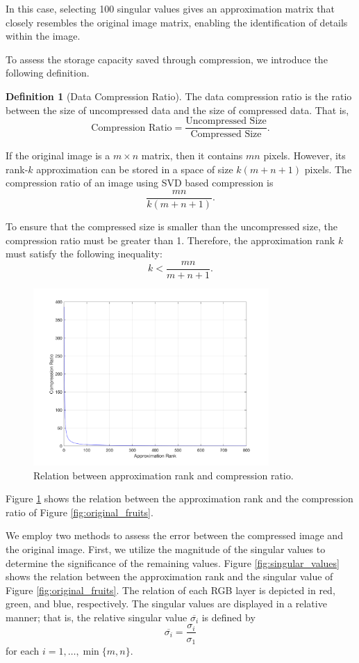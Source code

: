 \documentclass[12pt]{article}
\theoremstyle{definition}
\newtheorem{definition}[theorem]{Definition}
\begin{document}
In this case, selecting 100 singular values gives an approximation matrix that closely resembles the original image matrix, enabling the identification of details within the image.

To assess the storage capacity saved through compression, we introduce the following definition.

\begin{definition}[Data Compression Ratio]
    The data compression ratio is the ratio between the size of uncompressed data and the size of compressed data. That is,
    \[ \text{Compression Ratio} = \frac{\text{Uncompressed Size}}{\text{Compressed Size}}. \]
\end{definition}

If the original image is a $m\times n$ matrix, then it contains $mn$ pixels. However, its rank-$k$ approximation can be stored in a space of size $k(m+n+1)$ pixels. The compression ratio of an image using SVD based compression is
\[ \frac{mn}{k(m+n+1)}. \]

To ensure that the compressed size is smaller than the uncompressed size, the compression ratio must be greater than 1. Therefore, the approximation rank $k$ must satisfy the following inequality:
\[ k < \frac{mn}{m+n+1}. \]

\begin{figure}
    \centering
    \includegraphics[width=0.8\textwidth]{ch2_figures/compression_ratio.png}
    \caption{Relation between approximation rank and compression ratio.}
    \label{fig:3}
\end{figure}

Figure \ref{fig:3} shows the relation between the approximation rank and the compression ratio of Figure \ref{fig:original_fruits}.

We employ two methods to assess the error between the compressed image and the original image. First, we utilize the magnitude of the singular values to determine the significance of the remaining values. Figure \ref{fig:singular_values} shows the relation between the approximation rank and the singular value of Figure \ref{fig:original_fruits}. The relation of each RGB layer is depicted in red, green, and blue, respectively. The singular values are displayed in a relative manner; that is, the relative singular value $\overline{\sigma_i}$ is defined by
\[ \overline{\sigma_i} = \frac{\sigma_i}{\sigma_1} \]
for each $i = 1,\ldots, \min\{m,n\}$.
\end{document}
